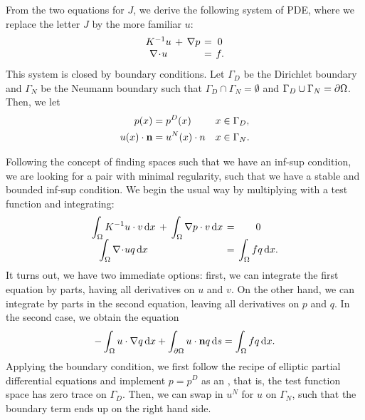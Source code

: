\begin{intro}
  From the two equations for $J$, we derive the following system of
  PDE, where we replace the letter $J$ by the more familiar $u$:
  \begin{gather}
    \label{eq:darcy:5}
    \arraycolsep2pt
    \begin{matrix}
      K^{-1} u &+& \nabla p &=& 0 \\
      \div u &&&=& f.
    \end{matrix}
  \end{gather}
  This system is closed by boundary conditions. Let $\Gamma_D$ be the
  Dirichlet boundary and $\Gamma_N$ be the Neumann boundary such that
  $\Gamma_D \cap \Gamma_N = \emptyset$ and
  $\Gamma_D\cup\Gamma_N = \partial\Omega$. Then, we let
  \begin{gather}
    \label{eq:darcy:6}
    \begin{aligned}
      p(x) &= p^D(x) & x & \in \Gamma_D, \\
      u(x)\cdot\mathbf n &= u^N(x)\cdot n & x & \in \Gamma_N.
    \end{aligned}
  \end{gather}

  Following the concept of finding spaces such that we have an inf-sup
  condition, we are looking for a pair with minimal regularity, such
  that we have a stable and bounded inf-sup condition. We begin the
  usual way by multiplying with a test function and integrating:
  \begin{gather}
    \label{eq:darcy:7}
    \arraycolsep2pt
    \begin{matrix}
      \displaystyle\int_\domain K^{-1} u\cdot v\dx
      &+&
      \displaystyle\int_\domain \nabla p \cdot v\dx
      &=& 0 \\
      \displaystyle\int_\domain \div u q\dx
      &&&=&
      \displaystyle\int_\domain f q\dx.
    \end{matrix}
  \end{gather}
  It turns out, we have two immediate options: first, we can integrate
  the first equation by parts, having all derivatives on $u$ and $v$.
  On the other hand, we can integrate by parts in the second equation,
  leaving all derivatives on $p$ and $q$. In the second case,
  we obtain the equation
  \begin{gather}
    -\int_\Omega u\cdot\nabla q\,\mathrm{d} x + \int_{\partial\Omega} u\cdot\mathbf n q \,\mathrm{d} s
    = \int_\Omega f q\,\mathrm{d} x.
  \end{gather}
  Applying the boundary condition, we first follow the recipe of
  elliptic partial differential equations and implement $p=p^D$ as an
  , that is, the test function
  space has zero trace on $\Gamma_D$. Then, we can swap in $u^N$ for
  $u$ on $\Gamma_N$, such that the boundary term ends up on the right
  hand side.
\end{intro}

